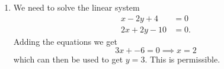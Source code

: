 \documentclass[a4paper,12pt]{article}
\begin{document}
\begin{enumerate}
{\begin{enumerate}
{    	  Also, lots of people didn't comment on the fact the `interaction' terms are not really interactions: you can't have $y$ decreasing $x$ if there is no $x$, but this model does exactly that. 
          }


        \item
            We need to solve the linear system
            \begin{align}
              x-2y +4 & = 0\\
              2x +2y -10 & = 0.
            \end{align}
            Adding the equations we get
            \begin{equation}
              3x + -6 = 0 \implies x = 2
            \end{equation}
            which can then be used to get $y =3$. This is permissible.

            
          

\end{enumerate}}
\end{enumerate}
\end{document}
